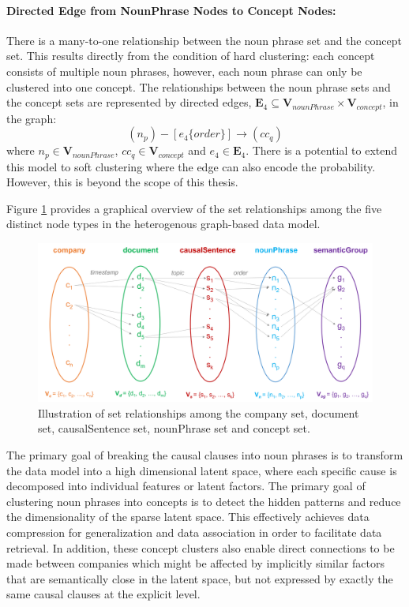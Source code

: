 \documentclass [
     12pt,         %
     a4paper,      %
     BCOR10mm,     %
     DIV14,        %
     liststotoc,   %
     bibtotoc,     %
     idxtotoc,     %
     parskip       %
     ]{scrreprt}
\begin{document}
\paragraph{Directed Edge from NounPhrase Nodes to Concept Nodes:} There is a many-to-one relationship between the noun phrase set and the concept set. This results directly from the condition of hard clustering: each concept consists of multiple noun phrases, however, each noun phrase can only be clustered into one concept. The relationships between the noun phrase sets and the concept sets are represented by directed edges, $\mathbf{E}_4 \subseteq \mathbf{V}_{nounPhrase} \times \mathbf{V}_{concept}$, in the graph:
\[( n_p ) - [ e_4 \{order\} ]\rightarrow ( cc_q ) \] 
where $n_p \in \mathbf{V}_{nounPhrase}$, $cc_q \in \mathbf{V}_{concept}$ and $e_4 \in \mathbf{E}_4$.
There is a potential to extend this model to soft clustering where the edge can also encode the probability. However, this is beyond the scope of this thesis. 


Figure \ref{fig:AssumpSet} provides a graphical overview of the set relationships among the five distinct node types in the heterogenous graph-based data model.
\begin{figure}[h!]
\centering
  \includegraphics[scale=0.4]{figures/Sets.png}
  \caption{Illustration of set relationships among the company set, document set, causalSentence set, nounPhrase set and concept set.}
  \label{fig:AssumpSet}
\end{figure}

The primary goal of breaking the causal clauses into noun phrases is to transform the data model into a high dimensional latent space, where each specific cause is decomposed into individual features or latent factors. The primary goal of clustering noun phrases into concepts is to detect the hidden patterns and reduce the dimensionality of the sparse latent space. This effectively achieves data compression for generalization and data association in order to facilitate data retrieval. In addition, these concept clusters also enable direct connections to be made between companies which might be affected by implicitly similar factors that are semantically close in the latent space, but not expressed by exactly the same causal clauses at the explicit level. 
\end{document}
